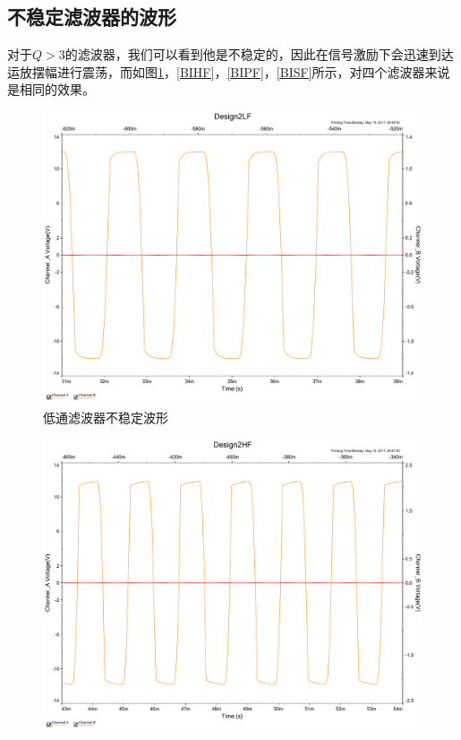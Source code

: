 \documentclass[UTF8,a4paper]{paper}
\begin{document}
\begin{multicols}{2}
\subsection{不稳定滤波器的波形}
对于$Q>3$的滤波器，我们可以看到他是不稳定的，因此在信号激励下会迅速到达运放摆幅进行震荡，而如图\ref{BILF}，\ref{BIHF}，\ref{BIPF}，\ref{BISF}所示，对四个滤波器来说是相同的效果。
\begin{figure}[H]
\centering
\includegraphics[width=\columnwidth]{2LF.pdf}
\caption{低通滤波器不稳定波形}
\label{BILF}
\end{figure}
\begin{figure}[H]
\centering
\includegraphics[width=\columnwidth]{2HF.pdf}

\end{figure}
\end{multicols}
\end{document}
